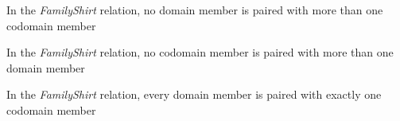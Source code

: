 \documentclass{ximera}
\begin{document}
\begin{exercise}
\begin{question} 
In the \textit{FamilyShirt} relation, no domain member is paired with more than one codomain member

\begin{multipleChoice}
\end{multipleChoice}
\end{question}








\begin{question} 
In the \textit{FamilyShirt} relation, no codomain member is paired with more than one domain member

\begin{multipleChoice}
\end{multipleChoice}
\end{question}








\begin{question} 
In the \textit{FamilyShirt} relation, every domain member is paired with exactly one codomain member

\begin{multipleChoice}
\end{multipleChoice}
\end{question}







\end{exercise}
\end{document}
